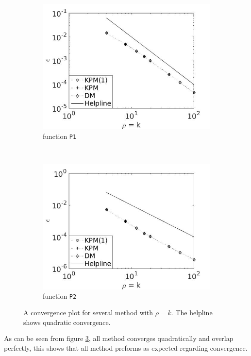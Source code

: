 \begin{figure}[H]
        \centering
        \begin{subfigure}[b]{0.45\textwidth}
                \includegraphics[width=\textwidth]{fig/s1conv1}
                \caption{function \texttt{P1}}
                \label{fig:conv1}
        \end{subfigure}%
~
        \begin{subfigure}[b]{0.45\textwidth}
                \includegraphics[width=\textwidth]{fig/s2conv2}
                \caption{function \texttt{P2}}
                \label{fig:conv2}
        \end{subfigure}
        \caption{A convergence plot for several method with $\rho = k$. The helpline shows quadratic convergence.}\label{fig:conv}
\end{figure}
As can be seen from figure \ref{fig:conv}, all method converges quadratically and overlap perfectly, this shows that all method preforms as expected regarding convergence.
